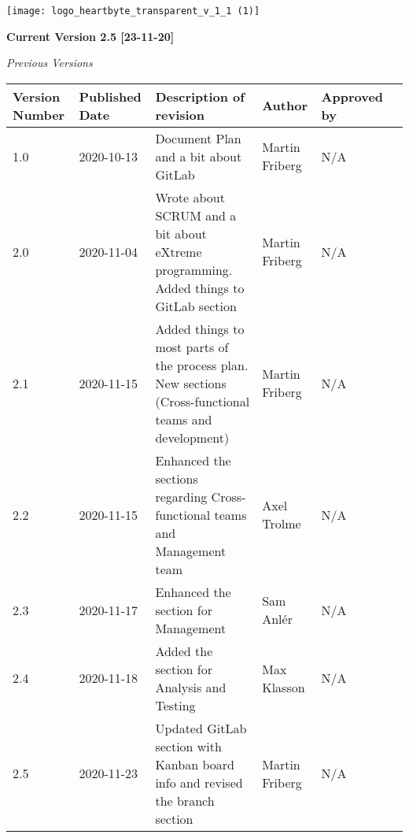\maketitle
\setlength{\parskip}{0em}

\begin{center}

      \vfill
\texttt{[image: logo\_heartbyte\_transparent\_v\_1\_1 (1)]}

    \vfill
\clearpage


    \textbf{\large Current Version 2.5 [23-11-20]}
    \vspace{10mm}
    
    \emph{\large Previous Versions}
    
\begin{center}
\begin{tabular}{ | m{5em} | m{5em}| m{10em} |m{5em}| m{5em} |m{5em} |  } 
\hline
Version Number& Published Date & Description of revision & Author & Approved by \\ 
\hline
1.0 & 2020-10-13 & Document Plan and a bit about GitLab & Martin Friberg & N/A \\
\hline
2.0 & 2020-11-04 & Wrote about SCRUM and a bit about eXtreme programming. Added things to GitLab section & Martin Friberg & N/A \\ 
\hline
2.1 & 2020-11-15 & Added things to most parts of the process plan. New sections (Cross-functional teams and development) & Martin Friberg & N/A \\
\hline
2.2 & 2020-11-15 & Enhanced the sections regarding Cross-functional teams and Management team & Axel Trolme & N/A \\
\hline
2.3 & 2020-11-17 & Enhanced the section for Management & Sam Anlér & N/A \\
\hline
2.4 & 2020-11-18 & Added the section for Analysis and Testing & Max Klasson & N/A \\
\hline
2.5 & 2020-11-23 & Updated GitLab section with Kanban board info and revised the branch section & Martin Friberg & N/A \\
\hline

\end{tabular}
\end{center}

\end{center}

\clearpage
    {
 
        \renewcommand{\contentsname}{Innehåll}
        \tableofcontents
    }
    
\clearpage